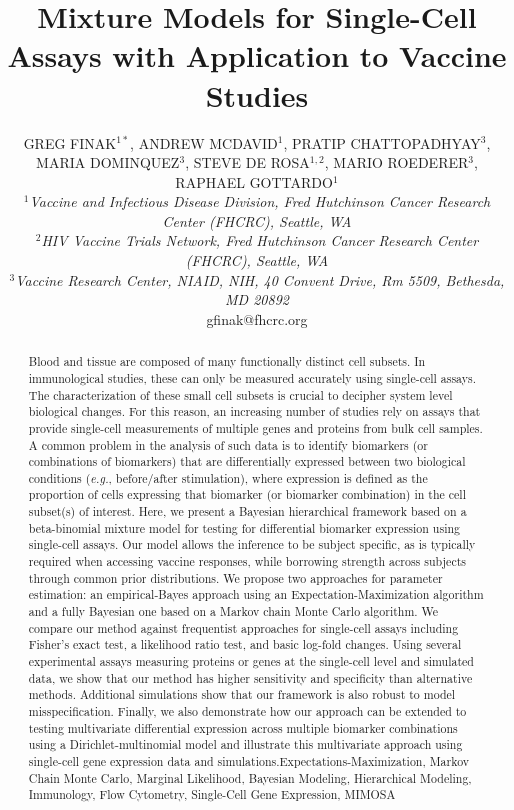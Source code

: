\documentclass[12pt,oupdraft]{biostatistics}
\title{Mixture Models for Single-Cell Assays with Application to Vaccine Studies}
\author{GREG FINAK$^{1\ast}$, 
 ANDREW MCDAVID$^{1}$,
 PRATIP CHATTOPADHYAY$^{3}$,
 MARIA DOMINQUEZ$^{3}$,
 STEVE DE ROSA$^{1,2}$,
 MARIO ROEDERER$^{3}$,\\
 RAPHAEL GOTTARDO$^{1}$
 \\[4pt]
\textit{ $^{1}$Vaccine and Infectious Disease Division, Fred Hutchinson Cancer Research Center (FHCRC), Seattle, WA\\
 $^{2}$HIV Vaccine Trials Network, Fred Hutchinson Cancer Research Center (FHCRC), Seattle, WA\\
 $^{3}$Vaccine Research Center, NIAID, NIH, 40 Convent Drive, Rm 5509, Bethesda, MD 20892}
 \\[2pt]
 {gfinak@fhcrc.org}}
\date{}
\begin{document}




\maketitle
{}

\begin{abstract}
{Blood and tissue are composed of many functionally distinct cell subsets. In immunological studies, these can only be measured accurately using single-cell assays. The characterization of these small cell subsets is crucial to decipher system level biological changes. For this reason, an increasing number of studies rely on assays that provide single-cell measurements of multiple genes and proteins from bulk cell samples. A common problem in the analysis of such data is to identify biomarkers (or combinations of biomarkers) that are differentially expressed between two biological conditions (\textit{e.g.}, before/after stimulation), where expression is defined as the proportion of cells expressing that biomarker (or biomarker combination) in the cell subset(s) of interest.
Here, we present a Bayesian hierarchical framework based on a beta-binomial mixture model for testing for differential biomarker expression using single-cell assays. Our model allows the inference to be subject specific, as is typically required when accessing vaccine responses, while borrowing strength across subjects through common prior distributions. We propose two approaches for parameter estimation: an empirical-Bayes approach using an Expectation-Maximization algorithm and a fully Bayesian one based on a Markov chain Monte Carlo algorithm. We compare our method against frequentist approaches for single-cell assays including Fisher's exact test, a likelihood ratio test, and basic log-fold changes. Using several experimental assays measuring proteins or genes at the single-cell level and simulated data, we show that our method has higher sensitivity and specificity than alternative methods. Additional simulations show that our framework is also robust to model misspecification. Finally, we also demonstrate how our approach can be extended to testing multivariate differential expression across multiple biomarker combinations using a Dirichlet-multinomial model and illustrate this multivariate approach using single-cell gene expression data and simulations.}{Expectations-Maximization, Markov Chain Monte Carlo,
Marginal Likelihood, Bayesian Modeling, Hierarchical Modeling,
Immunology, Flow Cytometry, Single-Cell Gene Expression, MIMOSA}
\end{abstract}
\end{document}
